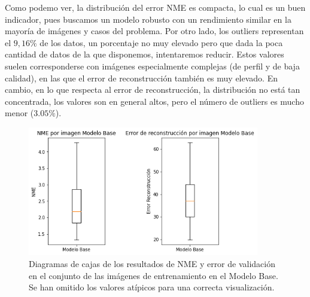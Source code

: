         \medskip

        \noindent Como podemo ver, la distribución del error NME es compacta, lo cual es un buen indicador, pues buscamos un modelo robusto con un rendimiento similar en la mayoría de imágenes y casos del problema. Por otro lado, los outliers representan el $9,16 \%$ de los datos, un porcentaje no muy elevado pero que dada la poca cantidad de datos de la que disponemos, intentaremos reducir. Estos valores suelen corresponderse con imágenes especialmente complejas (de perfil y de baja calidad), en las que el error de reconstrucción también es muy elevado. En cambio, en lo que respecta al error de reconstrucción, la distribución no está tan concentrada, los valores son en general altos, pero el número de outliers es mucho menor ($3.05\%$).

        \newpage
        \begin{figure}[H]
            \centering
            \includegraphics[width=0.9\textwidth]{img/boxplot_modelo_base.png}
            \caption{Diagramas de cajas de los resultados de NME y error de validación en el conjunto de las imágenes de entrenamiento en el Modelo Base. Se han omitido los valores atípicos para una correcta visualización.}
            \label{fig:boxplot_ModeloBase_NME}
        \end{figure}

